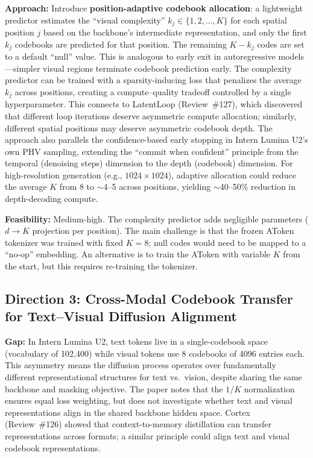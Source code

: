 \documentclass[11pt,a4paper]{article}
\begin{document}
\textbf{Approach:} Introduce \textbf{position-adaptive codebook allocation}: a lightweight predictor estimates the ``visual complexity'' $k_j \in \{1, 2, \ldots, K\}$ for each spatial position $j$ based on the backbone's intermediate representation, and only the first $k_j$ codebooks are predicted for that position. The remaining $K - k_j$ codes are set to a default ``null'' value. This is analogous to early exit in autoregressive models---simpler visual regions terminate codebook prediction early. The complexity predictor can be trained with a sparsity-inducing loss that penalizes the average $k_j$ across positions, creating a compute--quality tradeoff controlled by a single hyperparameter. This connects to LatentLoop (Review~\#127), which discovered that different loop iterations deserve asymmetric compute allocation; similarly, different spatial positions may deserve asymmetric codebook depth. The approach also parallels the confidence-based early stopping in Intern Lumina U2's own PHV sampling, extending the ``commit when confident'' principle from the temporal (denoising steps) dimension to the depth (codebook) dimension. For high-resolution generation (e.g., $1024 \times 1024$), adaptive allocation could reduce the average $K$ from 8 to $\sim$4--5 across positions, yielding $\sim$40--50\% reduction in depth-decoding compute.

\textbf{Feasibility:} Medium-high. The complexity predictor adds negligible parameters ($d \to K$ projection per position). The main challenge is that the frozen AToken tokenizer was trained with fixed $K{=}8$; null codes would need to be mapped to a ``no-op'' embedding. An alternative is to train the AToken with variable $K$ from the start, but this requires re-training the tokenizer.

\subsection{Direction 3: Cross-Modal Codebook Transfer for Text--Visual Diffusion Alignment}
\textbf{Gap:} In Intern Lumina U2, text tokens live in a single-codebook space (vocabulary of 102,400) while visual tokens use 8 codebooks of 4096 entries each. This asymmetry means the diffusion process operates over fundamentally different representational structures for text vs.\ vision, despite sharing the same backbone and masking objective. The paper notes that the $1/K$ normalization ensures equal loss weighting, but does not investigate whether text and visual representations align in the shared backbone hidden space. Cortex (Review~\#126) showed that context-to-memory distillation can transfer representations across formats; a similar principle could align text and visual codebook representations.
\end{document}
